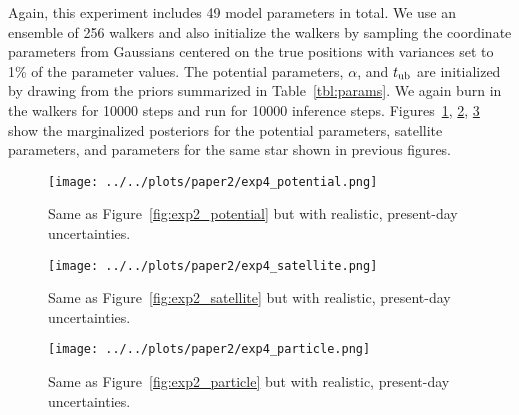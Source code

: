 \documentclass[letterpaper,12pt,preprint]{aastex}
\newcommand{\tub}{t_{\rm ub}}
\newcommand{\Loffset}{\alpha}
\begin{document}
Again, this experiment includes 49 model parameters in total. We use an ensemble of 256 walkers and also initialize the walkers by sampling the coordinate parameters from Gaussians centered on the true positions with variances set to 1\% of the parameter values. The potential parameters, $\Loffset$, and $\tub$ are initialized by drawing from the priors summarized in Table~\ref{tbl:params}. We again burn in the walkers for 10000 steps and run for 10000 inference steps. Figures~\ref{fig:exp4_potential}, \ref{fig:exp4_satellite}, \ref{fig:exp4_particle} show the marginalized posteriors for the potential parameters, satellite parameters, and parameters for the same star shown in previous figures. %

\begin{figure}[!ht]
\begin{center}
\texttt{[image: ../../plots/paper2/exp4\_potential.png]}
\caption{Same as Figure~\ref{fig:exp2_potential} but with realistic, present-day uncertainties. }\label{fig:exp4_potential}
\end{center}
\end{figure}

\begin{figure}[!ht]
\begin{center}
\texttt{[image: ../../plots/paper2/exp4\_satellite.png]}
\caption{ Same as Figure~\ref{fig:exp2_satellite} but with realistic, present-day uncertainties. }\label{fig:exp4_satellite}
\end{center}
\end{figure}

\begin{figure}[!ht]
\begin{center}
\texttt{[image: ../../plots/paper2/exp4\_particle.png]}
\caption{ Same as Figure~\ref{fig:exp2_particle} but with realistic, present-day uncertainties. }\label{fig:exp4_particle}
\end{center}
\end{figure}
\end{document}
